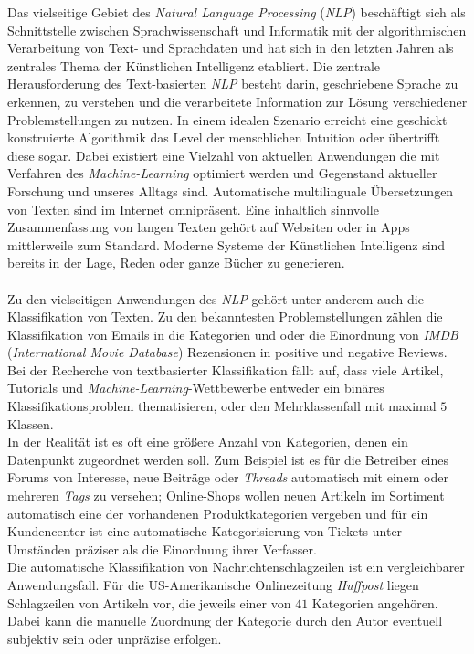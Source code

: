 \documentclass[a4paper,11pt]{article}
\begin{document}
Das vielseitige Gebiet des \textit{Natural Language Processing} (\textit{NLP}) beschäftigt sich als Schnittstelle zwischen Sprachwissenschaft und Informatik mit der algorithmischen Verarbeitung von Text- und Sprachdaten und hat sich in den letzten Jahren als zentrales Thema der Künstlichen Intelligenz etabliert. Die zentrale Herausforderung des Text-basierten \textit{NLP} besteht darin, geschriebene Sprache zu erkennen, zu verstehen und die verarbeitete Information zur Lösung verschiedener Problemstellungen zu nutzen. In einem idealen Szenario erreicht eine geschickt konstruierte Algorithmik das Level der menschlichen Intuition oder übertrifft diese sogar. Dabei existiert eine Vielzahl von aktuellen Anwendungen die mit Verfahren des \textit{Machine-Learning} optimiert werden und Gegenstand aktueller Forschung und unseres Alltags sind. Automatische multilinguale Übersetzungen von Texten sind im Internet omnipräsent. Eine inhaltlich sinnvolle Zusammenfassung von langen Texten gehört auf Websiten oder in Apps mittlerweile zum Standard. Moderne Systeme der Künstlichen Intelligenz sind bereits in der Lage, Reden oder ganze Bücher zu generieren. \\
\\
Zu den vielseitigen Anwendungen des \textit{NLP} gehört unter anderem auch die Klassifikation von Texten. Zu den bekanntesten Problemstellungen zählen die Klassifikation von Emails in die Kategorien  und  oder die Einordnung von \textit{IMDB} (\textit{International Movie Database}) Rezensionen in positive und negative Reviews. Bei der Recherche von textbasierter Klassifikation fällt auf, dass viele Artikel, Tutorials und \textit{Machine-Learning}-Wettbewerbe entweder ein binäres Klassifikationsproblem thematisieren, oder den Mehrklassenfall mit maximal $5$ Klassen. \\
In der Realität ist es oft eine größere Anzahl von Kategorien, denen ein Datenpunkt zugeordnet werden soll. Zum Beispiel ist es für die Betreiber eines Forums von Interesse, neue Beiträge oder \textit{Threads} automatisch mit einem oder mehreren \textit{Tags} zu versehen; Online-Shops wollen neuen Artikeln im Sortiment automatisch eine der vorhandenen Produktkategorien vergeben und für ein Kundencenter ist eine automatische Kategorisierung von Tickets unter Umständen präziser als die Einordnung ihrer Verfasser. \\
Die automatische Klassifikation von Nachrichtenschlagzeilen ist ein vergleichbarer Anwendungsfall. Für die US-Amerikanische Onlinezeitung \textit{Huffpost} liegen Schlagzeilen von Artikeln vor, die jeweils einer von $41$ Kategorien angehören. Dabei kann die manuelle Zuordnung der Kategorie durch den Autor eventuell subjektiv sein oder unpräzise erfolgen. \\
\end{document}

